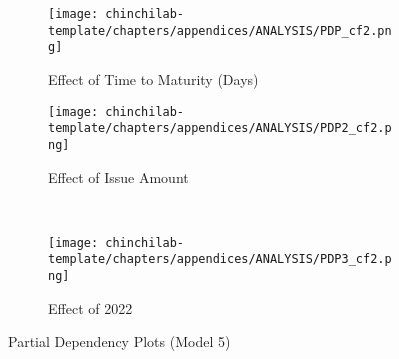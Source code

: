 \begin{figure}[H]
\centering
   \begin{subfigure}[b]{0.45\textwidth}
    \texttt{[image: chinchilab-template/chapters/appendices/ANALYSIS/PDP\_cf2.png]}
    \caption{Effect of Time to Maturity (Days)}
   \label{fig:Ng1} 
\end{subfigure}
\begin{subfigure}[b]{0.45\textwidth}
    \texttt{[image: chinchilab-template/chapters/appendices/ANALYSIS/PDP2\_cf2.png]}
    \caption{Effect of Issue Amount}
   \label{fig:Ng2}
\end{subfigure}
\\
\begin{subfigure}[b]{0.45\textwidth}
    \texttt{[image: chinchilab-template/chapters/appendices/ANALYSIS/PDP3\_cf2.png]}
    \caption{Effect of 2022}
   \label{fig:Ng2}
\end{subfigure}
\caption{Partial Dependency Plots (Model 5)}
\end{figure}

